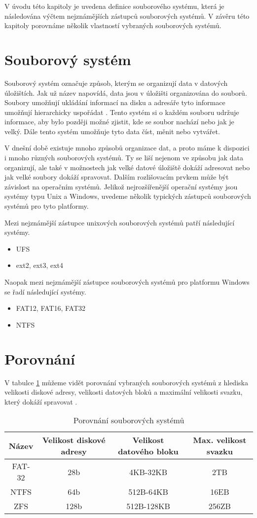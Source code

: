 V úvodu této kapitoly je uvedena definice souborového systému, která je následována výčtem nejznámějších zástupců souborových systémů. V závěru této kapitoly porovnáme několik vlastností vybraných souborových systémů.
\section{Souborový systém}
    \label{fs}
    Souborový systém označuje způsob, kterým se organizují data v datových úložištích. Jak už název napovídá, data jsou v úložišti organizována do souborů. Soubory umožňují ukládání informací na disku a adresáře tyto informace umožňují hierarchicky uspořádat \cite{fs}. Tento systém si o každém souboru udržuje informace, aby bylo později možné zjistit, kde se soubor nachází nebo jak je velký. Dále tento systém umožňuje tyto data číst, měnit nebo vytvářet.

    V dnešní době existuje mnoho způsobů organizace dat, a proto máme k dispozici i mnoho různých souborových systémů. Ty se liší nejenom ve způsobu jak data organizují,
    ale také v možnostech jak velké datové úložiště dokáží adresovat nebo jak velké soubory dokáží spravovat. Dalším rozlišovacím prvkem může být závislost na operačním systémů.
    Jelikož nejrozšířenější operační systémy jsou systémy typu Unix a Windows, uvedeme několik typických zástupců souborových systémů pro tyto platformy.

    Mezi nejznámější zástupce unixových souborových systémů patří následující systémy.
    \begin{itemize}
      \item UFS
      \item ext2, ext3, ext4
    \end{itemize}

    Naopak mezi nejznámější zástupce souborových systémů pro platformu Windows se řadí následující systémy.
    \begin{itemize}
      \item FAT12, FAT16, FAT32
      \item NTFS
    \end{itemize}

\section{Porovnání}
    V tabulce \ref{fscompare} můžeme vidět porovnání vybraných souborových systémů z hlediska velikosti diskové adresy, velikosti datových bloků a maximální velikosti svazku, který dokáží spravovat \cite{fs}.
    \begin{table}
    \centering
    \caption{Porovnání souborových systémů}
    \label{fscompare}
    \begin{tabular}{|c|c|c|c|}
    \hline
    Název & Velikost diskové adresy & Velikost datového bloku & Max. velikost svazku \\ \hline   
    FAT-32 & 28b & 4KB-32KB & 2TB \\ \hline
    NTFS & 64b & 512B-64KB & 16EB \\ \hline
    ZFS & 128b & 512B-128KB & 256ZB \\ \hline
    \end{tabular}
    \end{table} 